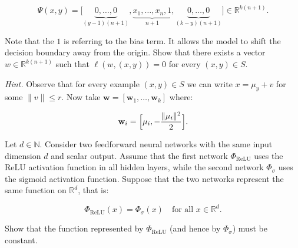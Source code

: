 \documentclass[11pt,a4paper]{article}
\newcommand{\examstatement}[1]{%
  \par\addvspace{0.85em}%
  \noindent{\bfseries #1}\par\nobreak\addvspace{0.28em}%
}
\begin{document}
\[
\Psi(x, y) = \bigl[ \underbrace{0, \dots, 0}_{(y-1)(n+1)}, \underbrace{x_1, \dots, x_n, 1}_{n+1}, \underbrace{0, \dots, 0}_{(k-y)(n+1)} \bigr] \in \mathbb{R}^{k(n+1)}.
\]

Note that the $1$ is referring to the bias term. It allows the model to shift the decision boundary away from the origin. Show that there exists a vector $w \in \mathbb{R}^{k(n+1)}$ such that $\ell(w, (x, y)) = 0$ for every $(x, y) \in S$.

\textit{Hint.} Observe that for every example $(x, y) \in S$ we can write $x = \mu_y + v$ for some $\|v\| \le r$. Now take $\mathbf{w} = [\mathbf{w}_1, \dots, \mathbf{w}_k]$ where:

\[
\mathbf{w}_i = \Bigl[\mu_i, -\frac{\|\mu_i\|^{2}}{2}\Bigr].
\]

\examstatement{Problem 5. [5 pts.]}
Let $d \in \mathbb{N}$. Consider two feedforward neural networks with the same input dimension $d$ and scalar output. Assume that the first network $\Phi_{\mathrm{ReLU}}$ uses the ReLU activation function in all hidden layers, while the second network $\Phi_{\sigma}$ uses the sigmoid activation function. Suppose that the two networks represent the same function on $\mathbb{R}^{d}$, that is:

\[
\Phi_{\mathrm{ReLU}}(x) = \Phi_{\sigma}(x) \quad \text{for all } x \in \mathbb{R}^{d}.
\]

Show that the function represented by $\Phi_{\mathrm{ReLU}}$ (and hence by $\Phi_{\sigma}$) must be constant.

\par
\end{document}
